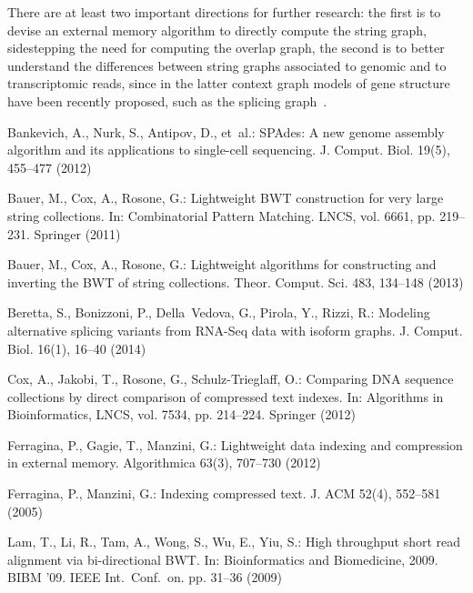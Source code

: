 \documentclass[runningheads,envcountsame,a4paper]{llncs}
\begin{document}
There are at least two important directions for further research: the first is
to devise an external memory algorithm to directly compute the string graph,
sidestepping the need for computing the overlap graph, the second is to
better understand the differences between string graphs associated to genomic
and to transcriptomic reads, since in the latter context graph models of gene structure
have been recently proposed, such as the splicing graph~\cite{Beretta2013}.



% 
% 

\begin{thebibliography}{10}
\providecommand{\url}[1]{\texttt{#1}}
\providecommand{\urlprefix}{URL }

Bankevich, A., Nurk, S., Antipov, D., et~al.: {SPAdes}: A new genome assembly
  algorithm and its applications to single-cell sequencing. J. Comput. Biol.
  19(5),  455--477 (2012)

Bauer, M., Cox, A., Rosone, G.: Lightweight {BWT} construction for very large
  string collections. In: Combinatorial Pattern Matching. LNCS, vol. 6661, pp.
  219--231. Springer (2011)

Bauer, M., Cox, A., Rosone, G.: Lightweight algorithms for constructing and
  inverting the {BWT} of string collections. Theor. Comput. Sci.  483,
  134--148 (2013)

Beretta, S., Bonizzoni, P., Della~Vedova, G., Pirola, Y., Rizzi, R.: Modeling
  alternative splicing variants from {RNA-Seq} data with isoform graphs. J.
  Comput. Biol.  16(1),  16--40 (2014)

Cox, A., Jakobi, T., Rosone, G., Schulz-Trieglaff, O.: Comparing {DNA} sequence
  collections by direct comparison of compressed text indexes. In: Algorithms
  in Bioinformatics, LNCS, vol. 7534, pp. 214--224. Springer (2012)

Ferragina, P., Gagie, T., Manzini, G.: Lightweight data indexing and
  compression in external memory. Algorithmica  63(3),  707--730 (2012)

Ferragina, P., Manzini, G.: Indexing compressed text. J. ACM  52(4),  552--581
  (2005)

Lam, T., Li, R., Tam, A., Wong, S., Wu, E., Yiu, S.: High throughput short read
  alignment via bi-directional {BWT}. In: Bioinformatics and Biomedicine, 2009.
  BIBM '09. IEEE Int.~Conf.~on. pp. 31--36 (2009)


\end{thebibliography}
\end{document}
